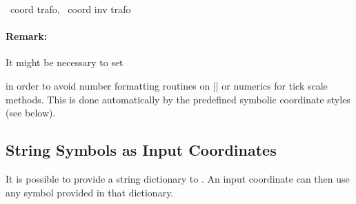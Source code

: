\begin{pgfplotsxycodekeylist}{%
    \x\ coord trafo,
    \x\ coord inv trafo%
}
    \paragraph{Remark:}

    It might be necessary to set
\begin{codeexample}
\end{codeexample}
    \noindent in order to avoid number formatting routines on |\tick| or
    numerics for tick scale methods. This is done automatically by the
    predefined symbolic coordinate styles (see below).
\end{pgfplotsxycodekeylist}


\subsection{String Symbols as Input Coordinates}

It is possible to provide a string dictionary to \PGFPlots{}. An input
coordinate can then use any symbol provided in that dictionary.

